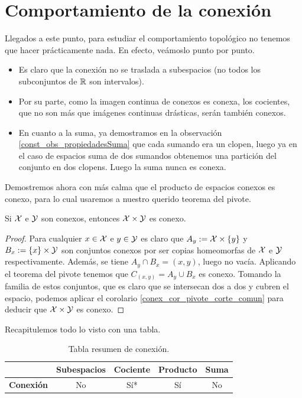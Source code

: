 \section{Comportamiento de la conexión}
Llegados a este punto, para estudiar el comportamiento topológico no tenemos que hacer prácticamente nada. En efecto, veámoslo punto por punto.
\begin{itemize}
	\item Es claro que la conexión no se traslada a subespacios (no todos los subconjuntos de $\mathbb{R}$ son intervalos).
	\item Por su parte, como la imagen continua de conexos es conexa, los cocientes, que no son más que imágenes continuas drásticas, serán también conexos.
	\item En cuanto a la suma, ya demostramos en la observación \ref{const_obs_propiedadesSuma} que cada sumando era un clopen, luego ya en el caso de espacios suma de dos sumandos obtenemos una partición del conjunto en dos clopens. Luego la suma nunca es conexa.
\end{itemize}
Demostremos ahora con más calma que el producto de espacios conexos es conexo, para lo cual usaremos a nuestro querido teorema del pivote.
\begin{prop}
	Si $\mathcal{X}$ e $\mathcal{Y}$ son conexos, entonces $\mathcal{X}\times \mathcal{Y}$ es conexo.
\end{prop}
\begin{proof}
	Para cualquier $x\in \mathcal{X}$ e $y\in \mathcal{Y}$ es claro que $A_y:=\mathcal{X}\times\{y\}$ y $B_x:=\{x\}\times \mathcal{Y}$ son conjuntos conexos por ser copias homeomorfas de $\mathcal{X}$ e $\mathcal{Y}$ respectivamente. Además, se tiene $A_y\cap B_x=(x,y)$, luego no vacía. Aplicando el teorema del pivote tenemos que $C_{(x,y)}=A_y\cup B_x$ es conexo. Tomando la familia de estos conjuntos, que es claro que se intersecan dos a dos y cubren el espacio, podemos aplicar el corolario \ref{conex_cor_pivote_corte_comun} para deducir que $\mathcal{X}\times \mathcal{Y}$ es conexo.
\end{proof}
Recapitulemos todo lo visto con una tabla.
\begin{table}[H]
	\centering
	\begin{tabular}{l|l|l|l|l|}
		\cline{2-5}
		& \textbf{Subespacios}    & \textbf{Cociente}       & \textbf{Producto}       & \textbf{Suma}           \\ \hline
		\multicolumn{1}{|c|}{\textbf{Conexión}} & \multicolumn{1}{c|}{No} & \multicolumn{1}{c|}{Sí*} & \multicolumn{1}{c|}{Sí} & \multicolumn{1}{c|}{No} \\ \hline
	\end{tabular}
	\caption{Tabla resumen de conexión.}
	\label{Tabla_conexion}
\end{table}
